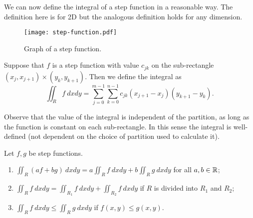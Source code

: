 We can now define the integral of a step function in a reasonable way.
The definition here is for 2D but the analogous definition holds for any dimension.
%
\begin{figure}
    \centering
    \texttt{[image: step-function.pdf]}
    \caption{Graph of a step function.}
\end{figure}
%
\begin{definition*}
    Suppose that \(f\) is a step function with value \(c_{jk}\) on the sub-rectangle \((x_{j},x_{j+1})\times (y_{k},y_{k+1})\).
    Then we define the integral as
    \[
        \iint_{R} f \ dx dy = \sum_{j=0}^{m-1} \sum_{k=0}^{n-1} c_{jk} (x_{j+1}-x_{j})(y_{k+1}-y_{k}).
    \]
\end{definition*}
%
Observe that the value of the integral is independent of the partition, as long as the function is constant on each sub-rectangle.
In this sense the integral is well-defined (not dependent on the choice of partition used to calculate it).
%
\begin{theorem}%
    \label{thm:props-integral}
    Let \(f,g\) be step functions.
    \begin{enumerate}
        \item \(\displaystyle \iint_{R} (a f + b g) \ dx dy = a \displaystyle \iint_{R} f \ dx dy + b \displaystyle\iint_{R} g \ dx dy\) for all \(a,b\in \mathbb{R}\);
        \item \(\displaystyle\iint_{R} f \ dx dy =  \displaystyle\iint_{R_1} f \ dx dy + \displaystyle \iint_{R_2} f \ dx dy\) if \(R\) is divided into \(R_1\) and \(R_2\);
        \item \(\displaystyle\iint_{R} f \ dx dy \leq \displaystyle \iint_{R} g \ dx dy\) if \(f(x,y) \leq g(x,y)\).
    \end{enumerate}
\end{theorem}

